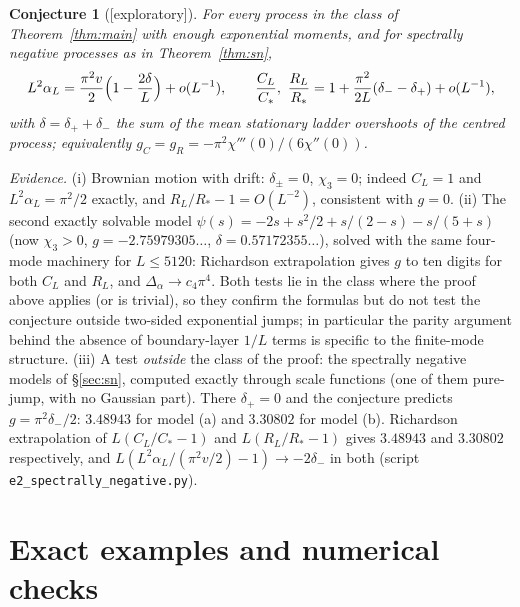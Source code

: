 \documentclass[11pt,a4paper]{article}
\newtheorem{conjecture}[theorem]{Conjecture}
\theoremstyle{definition}
\theoremstyle{remark}
\newcommand{\1}{\mathbf 1}
\newcommand{\status}[1]{\textsf{[#1]}}
\begin{document}
\begin{conjecture}[\status{exploratory}]\label{conj:general}
For every process in the class of Theorem~\ref{thm:main} with enough exponential moments, and for spectrally negative processes as in Theorem~\ref{thm:sn},
\[
L^2\alpha_L=\frac{\pi^2v}2\Bigl(1-\frac{2\delta}L\Bigr)+o(L^{-1}),\qquad
\frac{C_L}{C_*},\ \frac{R_L}{R_*}=1+\frac{\pi^2}{2L}(\delta_--\delta_+)+o(L^{-1}),
\]
with $\delta=\delta_++\delta_-$ the sum of the mean stationary ladder overshoots of the
centred process; equivalently $g_C=g_R=-\pi^2\chi'''(0)/(6\chi''(0))$.
\end{conjecture}

\noindent\emph{Evidence.} (i) Brownian motion with drift: $\delta_\pm=0$, $\chi_3=0$; indeed $C_L=1$ and
$L^2\alpha_L=\pi^2/2$ exactly, and $R_L/R_*-1=O(L^{-2})$, consistent with $g=0$.
(ii) The second exactly solvable model $\psi(s)=-2s+s^2/2+s/(2-s)-s/(5+s)$ (now
$\chi_3>0$, $g=-2.75979305\ldots$, $\delta=0.57172355\ldots$), solved with the same four-mode
machinery for $L\le5120$: Richardson extrapolation gives $g$ to ten digits for both
$C_L$ and $R_L$, and $\Delta_\alpha\to c_4\pi^4$. Both tests lie in the class where the
proof above applies (or is trivial), so they confirm the formulas but do not test the
conjecture outside two-sided exponential jumps; in particular the parity argument behind
the absence of boundary-layer $1/L$ terms is specific to the finite-mode structure.
(iii) A test \emph{outside} the class of the proof: the spectrally negative models of \S\ref{sec:sn}, computed exactly through scale functions (one of them pure-jump, with no Gaussian part). There $\delta_+=0$ and the conjecture predicts $g=\pi^2\delta_-/2$: $3.48943$ for model (a) and $3.30802$ for model (b). Richardson extrapolation of $L(C_L/C_*-1)$ and $L(R_L/R_*-1)$ gives $3.48943$ and $3.30802$ respectively, and $L(L^2\alpha_L/(\pi^2v/2)-1)\to-2\delta_-$ in both (script \texttt{e2\_spectrally\_negative.py}).

\section{Exact examples and numerical checks}\label{sec:examples}
\end{document}
